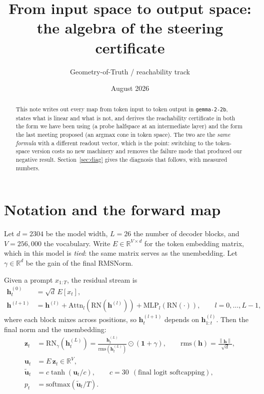 \documentclass[11pt]{article}
\title{From input space to output space:\\the algebra of the steering certificate}
\author{Geometry-of-Truth / reachability track}
\date{August 2026}
\newcommand{\R}{\mathbb{R}}
\newcommand{\vh}{\bm{h}}
\newcommand{\vz}{\bm{z}}
\newcommand{\norm}[1]{\left\lVert #1 \right\rVert}
\begin{document}
\maketitle

\begin{abstract}
This note writes out every map from token input to token output in
\texttt{gemma-2-2b}, states what is linear and what is not, and derives the
reachability certificate in both the form we have been using (a probe halfspace at an
intermediate layer) and the form the last meeting proposed (an argmax cone in token
space). The two are the \emph{same formula} with a different readout vector, which is
the point: switching to the token-space version costs no new machinery and removes
the failure mode that produced our negative result. Section~\ref{sec:diag} gives the
diagnosis that follows, with measured numbers.
\end{abstract}

\section{Notation and the forward map}

Let $d = 2304$ be the model width, $L = 26$ the number of decoder blocks, and
$V = 256{,}000$ the vocabulary. Write $E \in \R^{V \times d}$ for the token embedding
matrix, which in this model is \emph{tied}: the same matrix serves as the unembedding.
Let $\gamma \in \R^d$ be the gain of the final RMSNorm.

Given a prompt $x_{1:T}$, the residual stream is
\begin{align}
  \vh^{(0)}_t &= \sqrt{d}\, E[x_t], \label{eq:embed}\\
  \vh^{(l+1)} &= \vh^{(l)} + \mathrm{Attn}_l\!\left(\mathrm{RN}(\vh^{(l)})\right)
                  + \mathrm{MLP}_l\!\left(\mathrm{RN}(\cdot)\right),
                  \qquad l = 0,\dots,L-1, \label{eq:block}
\end{align}
where each block mixes across positions, so $\vh^{(l+1)}_t$ depends on
$\vh^{(l)}_{1:t}$. Then the final norm and the unembedding:
\begin{align}
  \vz_t &= \mathrm{RN}_\gamma\!\left(\vh^{(L)}_t\right)
        = \frac{\vh^{(L)}_t}{\mathrm{rms}(\vh^{(L)}_t)} \odot (\bm{1} + \gamma),
        \qquad \mathrm{rms}(\vh) = \frac{\norm{\vh}}{\sqrt{d}}, \label{eq:rmsnorm}\\
  \bm{u}_t &= E\,\vz_t \in \R^{V}, \label{eq:logits}\\
  \tilde{\bm{u}}_t &= c \tanh(\bm{u}_t / c), \qquad c = 30 \ \ (\text{final logit
    softcapping}), \label{eq:softcap}\\
  p_t &= \mathrm{softmax}(\tilde{\bm{u}}_t / T). \label{eq:softmax}
\end{align}
\end{document}
